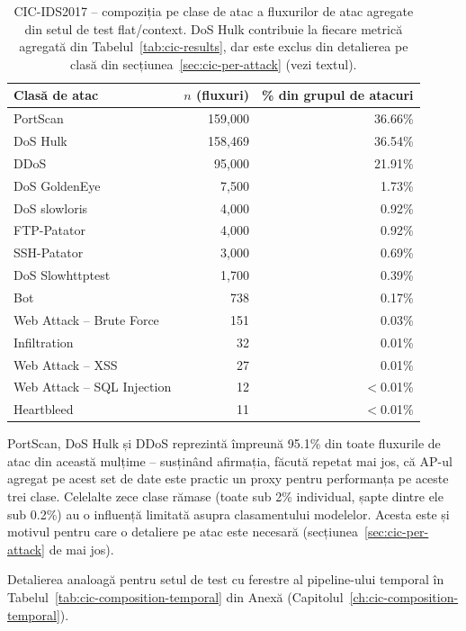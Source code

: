 \begin{table}[h]
\centering
\begin{tabular}{@{}lrr@{}}
\toprule
Clasă de atac & $n$ (fluxuri) & \% din grupul de atacuri \\
\midrule
PortScan            & 159{,}000 & 36.66\% \\
DoS Hulk            & 158{,}469 & 36.54\% \\
DDoS                & 95{,}000  & 21.91\% \\
DoS GoldenEye       & 7{,}500   & 1.73\%  \\
DoS slowloris       & 4{,}000   & 0.92\%  \\
FTP-Patator         & 4{,}000   & 0.92\%  \\
SSH-Patator         & 3{,}000   & 0.69\%  \\
DoS Slowhttptest    & 1{,}700   & 0.39\%  \\
Bot                 & 738       & 0.17\%  \\
Web Attack -- Brute Force & 151 & 0.03\%  \\
Infiltration        & 32        & 0.01\%  \\
Web Attack -- XSS    & 27        & 0.01\%  \\
Web Attack -- SQL Injection & 12 & $<$0.01\% \\
Heartbleed          & 11        & $<$0.01\% \\
\bottomrule
\end{tabular}
\caption{CIC-IDS2017 -- compoziția pe clase de atac a fluxurilor de atac agregate din setul de test flat/context. DoS Hulk contribuie la fiecare metrică agregată din Tabelul~\ref{tab:cic-results}, dar este exclus din detalierea pe clasă din secțiunea~\ref{sec:cic-per-attack} (vezi textul).}
\label{tab:cic-composition}
\end{table}

PortScan, DoS Hulk și DDoS reprezintă împreună 95.1\% din toate fluxurile de atac din această mulțime -- susținând afirmația, făcută repetat mai jos, că AP-ul agregat pe acest set de date este practic un proxy pentru performanța pe aceste trei clase. Celelalte zece clase rămase (toate sub 2\% individual, șapte dintre ele sub 0.2\%) au o influență limitată asupra clasamentului modelelor. Acesta este și motivul pentru care o detaliere pe atac este necesară (secțiunea~\ref{sec:cic-per-attack} de mai jos).

Detalierea analoagă pentru setul de test cu ferestre al pipeline-ului temporal în Tabelul~\ref{tab:cic-composition-temporal} din Anexă (Capitolul~\ref{ch:cic-composition-temporal}).

